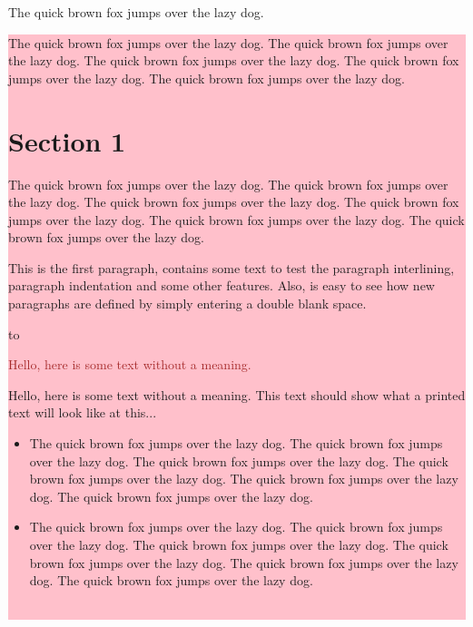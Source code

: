 \documentclass[11pt,a4paper]{report}
\begin{document}
The quick brown fox jumps over the lazy dog.\\
\colorbox{pink}{\parbox{\textwidth}{%
  \vskip10pt
  \lipsum[1]
  \vskip10pt
 }

The quick brown fox jumps over the lazy dog. The quick brown fox jumps over the lazy dog. The quick brown fox jumps over the lazy dog. The quick brown fox jumps over the lazy dog. The quick brown fox jumps over the lazy dog.

\section{Section 1}
\label{sec:sec1}
\noindent
The quick brown fox jumps over the lazy dog. The quick brown fox jumps over the lazy dog. The quick brown fox jumps over the lazy dog. The quick brown fox jumps over the lazy dog. The quick brown fox jumps over the lazy dog. The quick brown fox jumps over the lazy dog.

\setlength{\parindent}{0pt}
\setlength{\parskip}{1em}
\renewcommand{\baselinestretch}{2.0}

This is the first paragraph, contains some text to test the paragraph
interlining, paragraph indentation and some other features. Also, is 
easy to see how new paragraphs are defined by simply entering a double 
blank space.

\colorbox{pink}{\hbox to \textwidth{alert box\hfill}}

\textcolor{brown}{Hello, here is some text without a meaning.}

\colorbox{pink}{\parbox{\textwidth}{\lipsum[1]}}

Hello, here is some text without a meaning. This text should
show what a printed text will look like at this... 

\begin{itemize}
    \item The quick brown fox jumps over the lazy dog. The quick brown fox jumps over the lazy dog. The quick brown fox jumps over the lazy dog. The quick brown fox jumps over the lazy dog. The quick brown fox jumps over the lazy dog. The quick brown fox jumps over the lazy dog.
    \item The quick brown fox jumps over the lazy dog. The quick brown fox jumps over the lazy dog. The quick brown fox jumps over the lazy dog. The quick brown fox jumps over the lazy dog. The quick brown fox jumps over the lazy dog. The quick brown fox jumps over the lazy dog.
\end{itemize}\\

}
\end{document}
